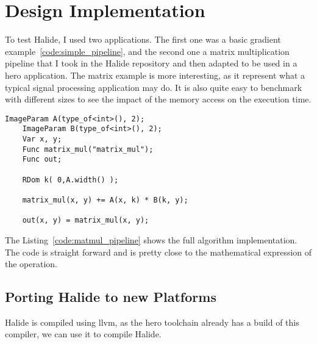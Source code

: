 

\chapter{Design Implementation}
	To test Halide, I used two applications. The first one was a basic gradient example~\ref{code:simple_pipeline}, and the second one a matrix multiplication pipeline that I took in the Halide repository and then adapted to be used in a hero application.
The matrix example is more interesting, as it represent what a typical signal processing application may do. It is also quite easy to benchmark with different sizes to see the impact of the memory access on the execution time.

\lstset{basicstyle=\ttfamily\footnotesize,breaklines=true,tabsize=2}
\begin{lstlisting}[caption={Matrix Multiplication Pipeline}, captionpos=b, label={code:matmul_pipeline}]
    ImageParam A(type_of<int>(), 2);
    ImageParam B(type_of<int>(), 2);
    Var x, y;
    Func matrix_mul("matrix_mul");
    Func out;

    RDom k( 0,A.width() );

    matrix_mul(x, y) += A(x, k) * B(k, y);

    out(x, y) = matrix_mul(x, y);

\end{lstlisting}
	The Listing~\ref{code:matmul_pipeline} shows the full algorithm implementation. The code is straight forward and is pretty close to the mathematical expression of the operation.



\section { Porting Halide to new Platforms}
	Halide is compiled using \gls{llvm}, as the \gls{hero} toolchain already has a build of this compiler, we can use it to compile Halide.

